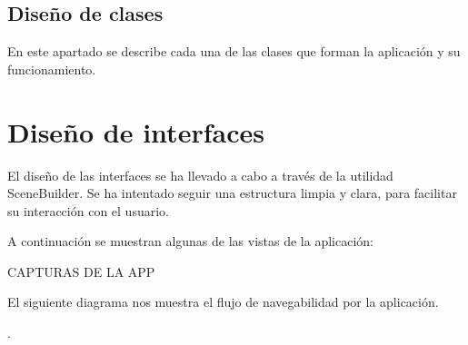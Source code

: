 



\subsection{Diseño de clases}

En este apartado se describe cada una de las clases que forman la aplicación y su funcionamiento.

\begin{landscape}
\end{landscape}

\newpage
\section{Diseño de interfaces}

El diseño de las interfaces se ha llevado a cabo a través de la utilidad SceneBuilder. Se ha intentado seguir una estructura limpia y clara, para facilitar su interacción con el usuario.

A continuación se muestran algunas de las vistas de la aplicación:

CAPTURAS DE LA APP

El siguiente diagrama nos muestra el flujo de navegabilidad por la aplicación.


.


